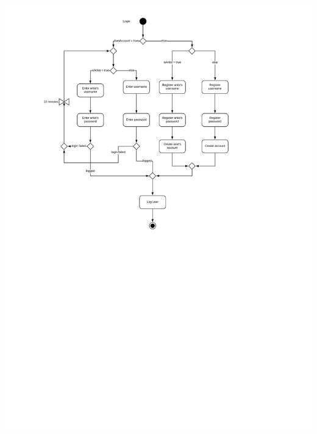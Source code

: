 \documentclass[11pt,a4paper]{article}
\begin{document}
\begin{itemize}
\includegraphics[scale=0.5]{logActivityDiagram.jpg}

\end{itemize}
\end{document}
